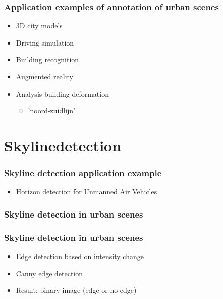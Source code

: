 \documentclass{beamer}
\begin{document}
\frame
{
	\frametitle{Application examples of annotation of urban scenes}
	\begin{itemize}
	\item 3D city models
	\item Driving simulation
	\item Building recognition
	\item Augmented reality
	\item <+-| alert@+> Analysis building deformation
		\begin{itemize}
		\item <+-| alert@+> 	'noord-zuidlijn'
		\end{itemize}
	\end{itemize}
}

\section{Skylinedetection}
\frame
{
	\frametitle{Skyline detection application example}
	\begin{itemize}
		\item <+-| alert@+> Horizon detection for Unmanned Air Vehicles
	\end{itemize}
}

\frame
{
	\frametitle{Skyline detection in urban scenes}%
}
\frame
{
	\frametitle{Skyline detection in urban scenes}%
	\begin{itemize}
		\item <+-| alert@+> Edge detection based on intensity change
		\item <+-| alert@+> Canny edge detection 
		\item <+-| alert@+> Result: binary image (edge or no edge)

	\end{itemize}
}
\end{document}
